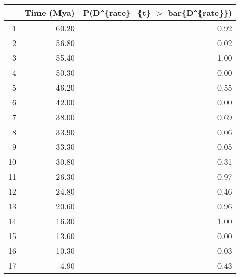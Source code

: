 \begin{table}[ht]
\centering
\begin{tabular}{rrr}
  \hline
 & Time (Mya) & P(D\verb|^|\{rate\}\_\{t\} $>$ bar\{D\verb|^|\{rate\}\}) \\ 
  \hline
1 & 60.20 & 0.92 \\ 
  2 & 56.80 & 0.02 \\ 
  3 & 55.40 & 1.00 \\ 
  4 & 50.30 & 0.00 \\ 
  5 & 46.20 & 0.55 \\ 
  6 & 42.00 & 0.00 \\ 
  7 & 38.00 & 0.69 \\ 
  8 & 33.90 & 0.06 \\ 
  9 & 33.30 & 0.05 \\ 
  10 & 30.80 & 0.31 \\ 
  11 & 26.30 & 0.97 \\ 
  12 & 24.80 & 0.46 \\ 
  13 & 20.60 & 0.96 \\ 
  14 & 16.30 & 1.00 \\ 
  15 & 13.60 & 0.00 \\ 
  16 & 10.30 & 0.03 \\ 
  17 & 4.90 & 0.43 \\ 
   \hline
\end{tabular}
\label{tab:rate_peak}
\end{table}
